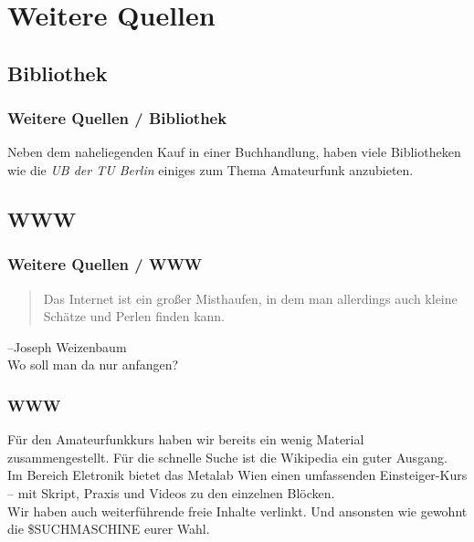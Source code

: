 \section{Weitere Quellen}

\subsection{Bibliothek}
\begin{frame}
    \frametitle{Weitere Quellen / Bibliothek}

    Neben dem naheliegenden Kauf in einer Buchhandlung, haben viele Bibliotheken
    wie die \emph{UB der TU Berlin}\hyperlink{refs}{\cite{ub}} einiges zum Thema
    Amateurfunk anzubieten.

\end{frame}

\subsection{WWW}

\begin{frame}
    \frametitle{Weitere Quellen / WWW}

    \begin{quote}
      Das Internet ist ein großer Misthaufen, in dem man allerdings auch kleine
      Schätze und Perlen finden kann.\hyperlink{refs}{\cite{quote}}
    \end{quote}

    \flushright --Joseph Weizenbaum \\[4em]

    \center Wo soll man da nur anfangen?

\end{frame}

\begin{frame}
    \frametitle{WWW}

    Für den Amateurfunkkurs haben wir bereits ein wenig
    Material\hyperlink{refs}{\cite{mat}} zusammengestellt. Für die schnelle
    Suche ist die Wikipedia\hyperlink{refs}{\cite{wp}} ein guter Ausgang. \\[2em]

    Im Bereich Eletronik bietet das Metalab Wien einen umfassenden
    Einsteiger-Kurs -- mit Skript, Praxis und Videos zu den einzelnen
    Blöcken\hyperlink{refs}{\cite{meta}}. \\[2em]

    Wir haben auch weiterführende freie Inhalte\hyperlink{refs}{\cite{fi}}
    verlinkt. Und ansonsten wie gewohnt die \$SUCHMASCHINE eurer Wahl.

\end{frame}

